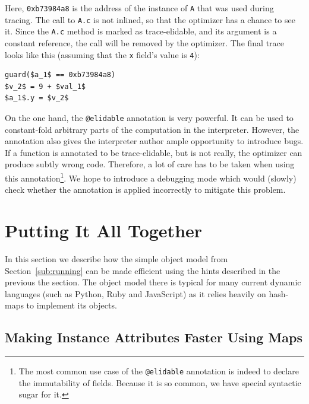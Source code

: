 \documentclass[preprint]{sigplanconf}
\newcommand{\noop}{}
\begin{document}
Here, \texttt{0xb73984a8} is the address of the instance of \texttt{A} that was used
during tracing. The call to \texttt{A.c} is not inlined, so that the optimizer
has a chance to see it. Since the \texttt{A.c} method is marked as trace-elidable, and its
argument
is a constant reference, the call will be removed by the optimizer. The final
trace looks like this (assuming that the \texttt{x} field's value is \texttt{4}):
%
{\noop
\begin{lstlisting}[mathescape,basicstyle=\ttfamily]
guard($a_1$ == 0xb73984a8)
$v_2$ = 9 + $val_1$
$a_1$.y = $v_2$
\end{lstlisting}
}

On the one hand, the \texttt{@elidable} annotation is very powerful. It can be
used to constant-fold arbitrary parts of the computation in the interpreter.
However, the annotation also gives the interpreter author ample opportunity to introduce bugs. If a
function is annotated to be trace-elidable, but is not really, the optimizer can produce
subtly wrong code. Therefore, a lot of care has to be taken when using this
annotation\footnote{The most common use case of the \texttt{@elidable}
annotation is indeed to declare the immutability of fields. Because it is so
common, we have special syntactic sugar for it.}. We hope to introduce a
debugging mode which would (slowly) check whether the annotation is applied
incorrectly to mitigate this problem.



\section{Putting It All Together}
\label{sec:fastobjmodel}

In this section we describe how the simple object model from
Section~\ref{sub:running} can be made efficient using the hints described in the
previous the section. The object model there is typical for many current
dynamic languages (such as Python, Ruby and JavaScript) as it relies heavily on
hash-maps to implement its objects.


\subsection{Making Instance Attributes Faster Using Maps}
\end{document}
